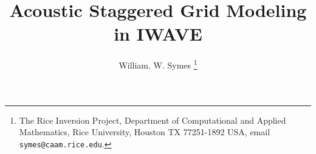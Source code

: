 
\title{Acoustic Staggered Grid Modeling in IWAVE}
\author{William. W. Symes \thanks{The Rice Inversion Project,
Department of Computational and Applied Mathematics, Rice University,
Houston TX 77251-1892 USA, email {\tt symes@caam.rice.edu}.}}




\maketitle



%

